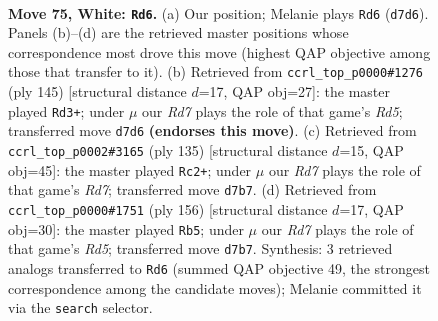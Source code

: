 \documentclass[11pt]{article}
\begin{document}
\clearpage

\begin{figure}[p]\centering
\begin{subfigure}{0.46\textwidth}\centering
\resizebox{\linewidth}{!}{%
\newchessgame
\chessboard[
  setfen={5k2/3R2p1/2N2p2/7p/3P3P/r5P1/6K1/8 w - - 43 75},
  showmover=false,
  pgfstyle=straightmove, color=movearrow, markmove={d7-d6}
]}
\caption{}
\end{subfigure}\hfill
\begin{subfigure}{0.46\textwidth}\centering
\resizebox{\linewidth}{!}{%
\newchessgame
\chessboard[
  setfen={8/6k1/R4p2/5PpP/p2r2P1/7K/8/8 b - - 5 73},
  showmover=false,
  pgfstyle=straightmove, color=movearrow, markmove={d4-d3}
]}
\caption{}
\end{subfigure}
\\[4pt]
\begin{subfigure}{0.46\textwidth}\centering
\resizebox{\linewidth}{!}{%
\newchessgame
\chessboard[
  setfen={6R1/8/3P4/2K2kp1/5p1p/7P/3r2P1/8 b - - 7 68},
  showmover=false,
  pgfstyle=straightmove, color=movearrow, markmove={d2-c2}
]}
\caption{}
\end{subfigure}\hfill
\begin{subfigure}{0.46\textwidth}\centering
\resizebox{\linewidth}{!}{%
\newchessgame
\chessboard[
  setfen={8/8/5pk1/P2R3p/7P/2r3P1/6K1/8 w - - 5 79},
  showmover=false,
  pgfstyle=straightmove, color=movearrow, markmove={d5-b5}
]}
\caption{}
\end{subfigure}
\caption{\textbf{Move 75, White: \texttt{Rd6}.} (a) Our position; Melanie plays \texttt{Rd6} (\texttt{d7d6}). Panels (b)--(d) are the retrieved master positions whose correspondence most drove this move (highest QAP objective among those that transfer to it). (b) Retrieved from \texttt{ccrl\_top\_p0000\#1276} (ply 145) [structural distance $d$=17, QAP obj=27]: the master played \texttt{Rd3+}; under $\mu$ our \emph{Rd7} plays the role of that game's \emph{Rd5}; transferred move \texttt{d7d6} \textbf{(endorses this move)}. (c) Retrieved from \texttt{ccrl\_top\_p0002\#3165} (ply 135) [structural distance $d$=15, QAP obj=45]: the master played \texttt{Rc2+}; under $\mu$ our \emph{Rd7} plays the role of that game's \emph{Rd7}; transferred move \texttt{d7b7}. (d) Retrieved from \texttt{ccrl\_top\_p0000\#1751} (ply 156) [structural distance $d$=17, QAP obj=30]: the master played \texttt{Rb5}; under $\mu$ our \emph{Rd7} plays the role of that game's \emph{Rd5}; transferred move \texttt{d7b7}. Synthesis: 3 retrieved analogs transferred to \texttt{Rd6} (summed QAP objective 49, the strongest correspondence among the candidate moves); Melanie committed it via the \texttt{search} selector.}
\label{fig:thought-m148}
\end{figure}
\end{document}
